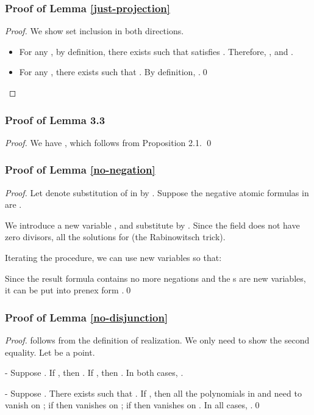 \documentclass[envcountsect]{llncs}
\begin{document}
{{\subsubsection{Proof of Lemma \ref{just-projection}}
\begin{proof} We show set inclusion in both directions.
\begin{itemize}
 \item
For any , by definition, there exists  such that  satisfies . Therefore, , and .
\item 
For any , there exists  such that . By definition, .\qed
\end{itemize}
\end{proof}

\subsubsection{Proof of Lemma 3.3}
\begin{proof}
We have , which follows from Proposition 2.1. \qed
\end{proof}


\subsubsection{Proof of Lemma \ref{no-negation}}
\begin{proof}
Let  denote substitution of  in  by . Suppose the negative atomic formulas in  are . 

We introduce a new variable , and substitute  by . Since the field  does not have zero divisors, all the solutions for  (the Rabinowitsch trick). 

Iterating the procedure, we can use  new variables  so that:

 Since the result formula contains no more negations and the s are new variables, it can be put into prenex form .\qed
\end{proof}

\subsubsection{Proof of Lemma \ref{no-disjunction}}
\begin{proof} follows from the definition of realization. We only need to show the second equality. Let  be a point.

- Suppose . If , then . If , then . In both cases, .

- Suppose . There exists  such that . If , then all the polynomials in  and  need to vanish on ; if  then  vanishes on ; if   then  vanishes on . In all cases, .\qed
\end{proof}



}}
\end{document}
